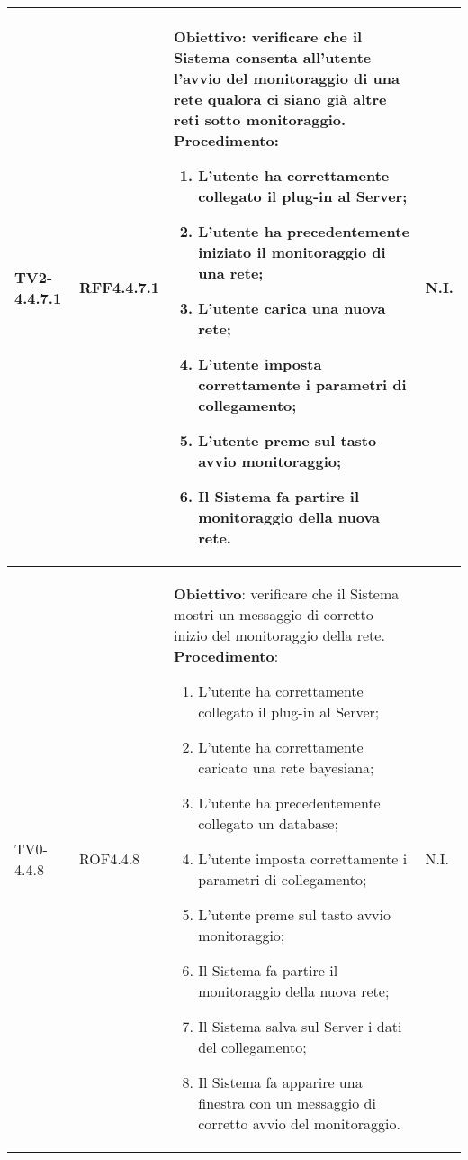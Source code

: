 \begin{longtable}{|C{.15\textwidth}|C{.13\textwidth}|m{.65\textwidth}|C{.08\textwidth}|}
TV2-4.4.7.1 & RFF4.4.7.1 &
	\textbf{Obiettivo}: verificare che il Sistema consenta all'utente l'avvio del monitoraggio di una rete qualora ci siano già altre reti sotto monitoraggio. \newline
	\textbf{Procedimento}:
	\begin{enumerate}
		\item L'utente ha correttamente collegato il plug-in al Server;
		\item L'utente ha precedentemente iniziato il monitoraggio di una rete;
		\item L'utente carica una nuova rete;
		\item L'utente imposta correttamente i parametri di collegamento;
		\item L'utente preme sul tasto avvio monitoraggio;
		\item Il Sistema fa partire il monitoraggio della nuova rete.
	\end{enumerate}
	& N.I. \\
\hline

TV0-4.4.8 & ROF4.4.8 &
	\textbf{Obiettivo}: verificare che il Sistema mostri un messaggio di corretto inizio del monitoraggio della rete. \newline
	\textbf{Procedimento}:
	\begin{enumerate}
		\item L'utente ha correttamente collegato il plug-in al Server;
		\item L'utente ha correttamente caricato una rete bayesiana;
		\item L'utente ha precedentemente collegato un database;
		\item L'utente imposta correttamente i parametri di collegamento;
		\item L'utente preme sul tasto avvio monitoraggio;
		\item Il Sistema fa partire il monitoraggio della nuova rete;
		\item Il Sistema salva sul Server i dati del collegamento;
		\item Il Sistema fa apparire una finestra con un messaggio di corretto avvio del monitoraggio.
	\end{enumerate}
	& N.I. \\
\hline


\end{longtable}
